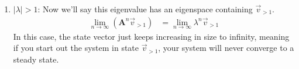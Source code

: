 {\begin{enumerate}
    \begin{align*}
         \lim_{n\to\infty}\left(\textbf{A}^n\vec{v}_{< 1}\right) &= \lim_{n\to\infty}\lambda^n\vec{v}_{< 1}\\
            &= \vec{0}
    \end{align*}
    Because $|\lambda| < 1$, multiplying it by itself repeatedly just makes the magnitude smaller and smaller. This holds whether $\lambda$ is positive or negative, and what this means is that if the system starts out in $\vec{v}_{< 1}$, after an infinite amount of time the state will approach $\vec{0}$. You can think of it as asymptotically approaching zero. For physical systems, (not in scope of the class) this is related to damping (overdamped being $\lambda > 0$ and underdamped being $\lambda < 0$).
    \item $|\lambda| > 1$: Now we'll say this eigenvalue has an eigenspace containing $\vec{v}_{> 1}$. 
    \begin{align*}
         \lim_{n\to\infty}\left(\textbf{A}^n\vec{v}_{> 1}\right) &= \lim_{n\to\infty}\lambda^n\vec{v}_{> 1}
    \end{align*}
    In this case, the state vector just keeps increasing in size to infinity, meaning if you start out the system in state $\vec{v}_{> 1}$, your system will never converge to a steady state.
\end{enumerate}
}